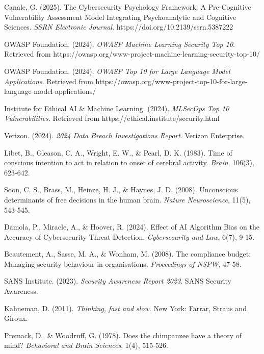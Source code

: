 \documentclass[11pt,a4paper]{article}
\begin{document}
\begin{thebibliography}{99}

Canale, G. (2025). The Cybersecurity Psychology Framework: A Pre-Cognitive Vulnerability Assessment Model Integrating Psychoanalytic and Cognitive Sciences. \textit{SSRN Electronic Journal}. https://doi.org/10.2139/ssrn.5387222

OWASP Foundation. (2024). \textit{OWASP Machine Learning Security Top 10}. Retrieved from https://owasp.org/www-project-machine-learning-security-top-10/

OWASP Foundation. (2024). \textit{OWASP Top 10 for Large Language Model Applications}. Retrieved from https://owasp.org/www-project-top-10-for-large-language-model-applications/

Institute for Ethical AI \& Machine Learning. (2024). \textit{MLSecOps Top 10 Vulnerabilities}. Retrieved from https://ethical.institute/security.html

Verizon. (2024). \textit{2024 Data Breach Investigations Report}. Verizon Enterprise.

Libet, B., Gleason, C. A., Wright, E. W., \& Pearl, D. K. (1983). Time of conscious intention to act in relation to onset of cerebral activity. \textit{Brain}, 106(3), 623-642.

Soon, C. S., Brass, M., Heinze, H. J., \& Haynes, J. D. (2008). Unconscious determinants of free decisions in the human brain. \textit{Nature Neuroscience}, 11(5), 543-545.

Damola, P., Miracle, A., \& Hoover, R. (2024). Effect of AI Algorithm Bias on the Accuracy of Cybersecurity Threat Detection. \textit{Cybersecurity and Law}, 6(7), 9-15.

Beautement, A., Sasse, M. A., \& Wonham, M. (2008). The compliance budget: Managing security behaviour in organisations. \textit{Proceedings of NSPW}, 47-58.

SANS Institute. (2023). \textit{Security Awareness Report 2023}. SANS Security Awareness.

Kahneman, D. (2011). \textit{Thinking, fast and slow}. New York: Farrar, Straus and Giroux.

Premack, D., \& Woodruff, G. (1978). Does the chimpanzee have a theory of mind? \textit{Behavioral and Brain Sciences}, 1(4), 515-526.


\end{thebibliography}
\end{document}
